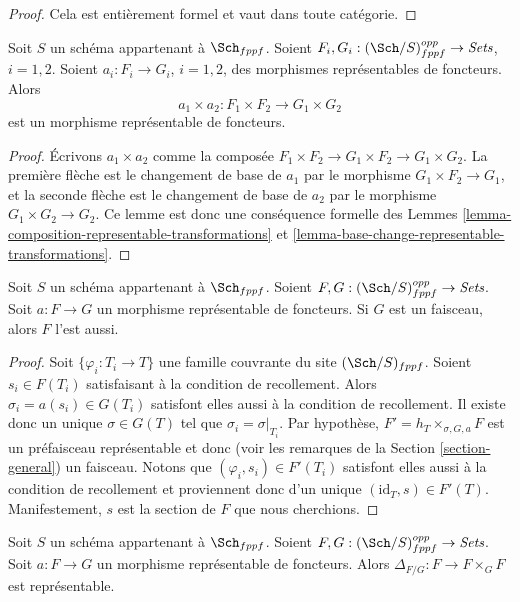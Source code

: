 \begin{proof}
Cela est entièrement formel et vaut dans toute catégorie.
\end{proof}

\begin{lemma}
\label{lemma-product-representable-transformations}
Soit $S$ un schéma appartenant à $\Sch_{fppf}$.
Soient $F_i, G_i : (\Sch/S)_{fppf}^{opp} \to \textit{Sets}$, $i = 1, 2$.
Soient $a_i : F_i \to G_i$, $i = 1, 2$,
des morphismes représentables de foncteurs.
Alors
$$
a_1 \times a_2 : F_1 \times F_2 \longrightarrow G_1 \times G_2
$$
est un morphisme représentable de foncteurs.
\end{lemma}

\begin{proof}
Écrivons $a_1 \times a_2$ comme la composée
$F_1 \times F_2 \to G_1 \times F_2 \to G_1 \times G_2$.
La première flèche est le changement de base de $a_1$ par le morphisme
$G_1 \times F_2 \to G_1$, et la seconde flèche
est le changement de base de $a_2$ par le morphisme
$G_1 \times G_2 \to G_2$. Ce lemme est donc une conséquence
formelle des Lemmes \ref{lemma-composition-representable-transformations}
et \ref{lemma-base-change-representable-transformations}.
\end{proof}

\begin{lemma}
\label{lemma-representable-transformation-to-sheaf}
Soit $S$ un schéma appartenant à $\Sch_{fppf}$.
Soient $F, G : (\Sch/S)_{fppf}^{opp} \to \textit{Sets}$.
Soit $a : F \to G$ un morphisme représentable de foncteurs.
Si $G$ est un faisceau, alors $F$ l'est aussi.
\end{lemma}

\begin{proof}
Soit $\{\varphi_i : T_i \to T\}$ une famille couvrante du site
$(\Sch/S)_{fppf}$.
Soient $s_i \in F(T_i)$ satisfaisant à la condition de recollement.
Alors $\sigma_i = a(s_i) \in G(T_i)$ satisfont elles aussi à la condition de recollement.
Il existe donc un unique $\sigma \in G(T)$ tel
que $\sigma_i = \sigma|_{T_i}$. Par hypothèse,
$F' = h_T \times_{\sigma, G, a} F$ est un préfaisceau représentable
et donc (voir les remarques de la Section \ref{section-general}) un faisceau.
Notons que $(\varphi_i, s_i) \in F'(T_i)$ satisfont
elles aussi à la condition de recollement et proviennent donc d'un unique
$(\text{id}_T, s) \in F'(T)$. Manifestement, $s$ est la section de
$F$ que nous cherchions.
\end{proof}

\begin{lemma}
\label{lemma-representable-transformation-diagonal}
Soit $S$ un schéma appartenant à $\Sch_{fppf}$.
Soient $F, G : (\Sch/S)_{fppf}^{opp} \to \textit{Sets}$.
Soit $a : F \to G$ un morphisme représentable de foncteurs.
Alors $\Delta_{F/G} : F \to F \times_G F$ est représentable.
\end{lemma}

